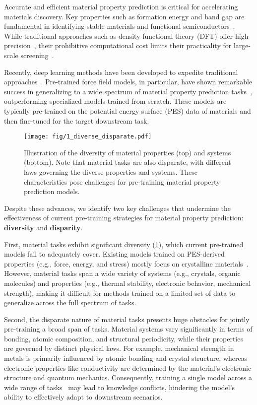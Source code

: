 Accurate and efficient material property prediction is critical for accelerating materials discovery. Key properties such as formation energy and band gap are fundamental in identifying stable materials and functional semiconductors~\cite{riebesell2023matbench, masood2023enhancing}. While traditional approaches such as density functional theory (DFT) offer high precision~\cite{jain2016computational}, their prohibitive computational cost limits their practicality for large-scale screening~\cite{fiedler2022deep, lan2023adsorbml}.

Recently, deep learning methods have been developed to expedite traditional approaches~\cite{xie2018crystal, griesemer2023accelerating}. Pre-trained force field models, in particular, have shown remarkable success in generalizing to a wide spectrum of material property prediction tasks~\cite{yang2024mattersim, barroso2024open, shoghi2023molecules}, outperforming specialized models trained from scratch. These models are typically pre-trained on the potential energy surface (PES) data of materials and then fine-tuned for the target downstream task.

\begin{figure}[!t]
    \centering
    \texttt{[image: fig/1\_diverse\_disparate.pdf]}
    \caption{Illustration of the diversity of material properties (top) and systems (bottom). Note that material tasks are also disparate, with different laws governing the diverse properties and systems. These characteristics pose challenges for pre-training material property prediction models.}
    \label{fig:intro}
\end{figure}

Despite these advances, we identify two key challenges that undermine the effectiveness of current pre-training strategies for material property prediction: \textbf{diversity} and \textbf{disparity}.

First, material tasks exhibit significant diversity (\cref{fig:intro}), which current pre-trained models fail to adequately cover. Existing models trained on PES-derived properties (e.g., force, energy, and stress) mostly focus on crystalline materials~\cite{yang2024mattersim, barroso2024open}. However, material tasks span a wide variety of systems (e.g., crystals, organic molecules) and properties (e.g., thermal stability, electronic behavior, mechanical strength), making it difficult for methods trained on a limited set of data to generalize across the full spectrum of tasks.

Second, the disparate nature of material tasks presents huge obstacles for jointly pre-training a broad span of tasks. Material systems vary significantly in terms of bonding, atomic composition, and structural periodicity, while their properties are governed by distinct physical laws. For example, mechanical strength in metals is primarily influenced by atomic bonding and crystal structure, whereas electronic properties like conductivity are determined by the material’s electronic structure and quantum mechanics. Consequently, training a single model across a wide range of tasks~\cite{shoghi2023molecules} may lead to knowledge conflicts, hindering the model’s ability to effectively adapt to downstream scenarios.

